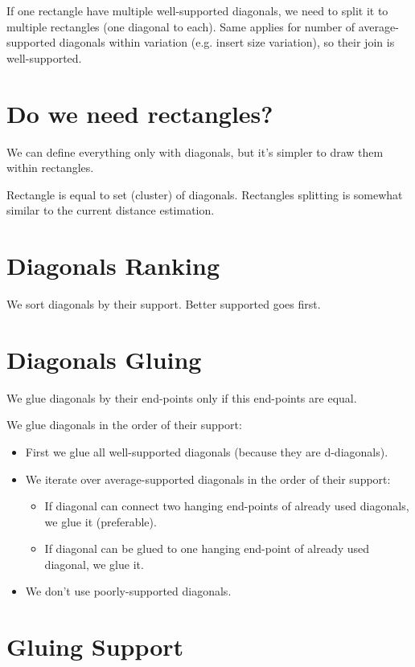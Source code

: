 \documentclass[a4paper]{article}
\begin{document}
If one rectangle have multiple well-supported diagonals, we need to split it to multiple rectangles (one diagonal to each). Same applies for number of average-supported diagonals within variation (e.g. insert size variation), so their join is well-supported.

\section{Do we need rectangles?}

We can define everything only with diagonals, but it's simpler to draw them within rectangles.

Rectangle is equal to set (cluster) of diagonals. Rectangles splitting is somewhat similar to the current distance estimation.

\section{Diagonals Ranking}

We sort diagonals by their support. Better supported goes first.

\section{Diagonals Gluing}

We glue diagonals by their end-points only if this end-points are equal.

We glue diagonals in the order of their support:
\begin{itemize}
\item First we glue all well-supported diagonals (because they are d-diagonals).
\item We iterate over average-supported diagonals in the order of their support:
\begin{itemize}
\item If diagonal can connect two hanging end-points of already used diagonals, we glue it (preferable).
\item If diagonal can be glued to one hanging end-point of already used diagonal, we glue it.
\end{itemize}
\item We don't use poorly-supported diagonals.
\end{itemize}

\section{Gluing Support}
\end{document}
